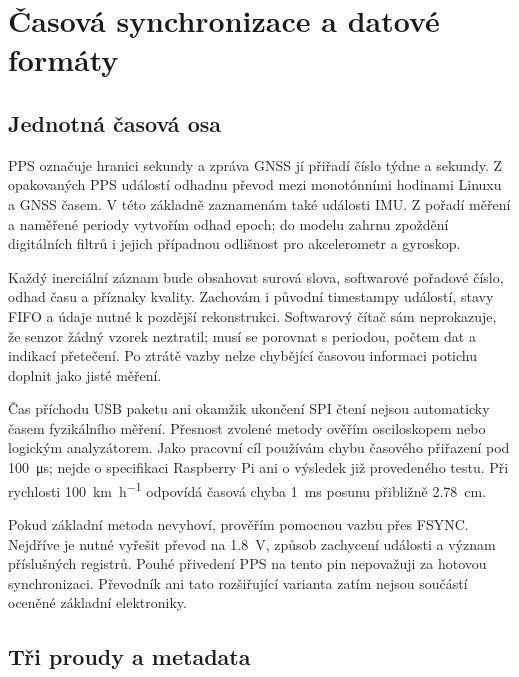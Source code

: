 \section{Časová synchronizace a datové formáty}

\subsection{Jednotná časová osa}

PPS označuje hranici sekundy a zpráva GNSS jí přiřadí číslo týdne a sekundy.
Z opakovaných PPS událostí odhadnu převod mezi monotónními hodinami Linuxu
a GNSS časem. V této základně zaznamenám také události IMU. Z pořadí měření
a naměřené periody vytvořím odhad epoch; do modelu zahrnu zpoždění digitálních
filtrů i jejich případnou odlišnost pro akcelerometr a gyroskop.

Každý inerciální záznam bude obsahovat surová slova, softwarové pořadové
číslo, odhad času a příznaky kvality. Zachovám i původní timestampy událostí,
stavy FIFO a údaje nutné k pozdější rekonstrukci. Softwarový čítač sám
neprokazuje, že senzor žádný vzorek neztratil; musí se porovnat s periodou,
počtem dat a indikací přetečení. Po ztrátě vazby nelze chybějící časovou
informaci potichu doplnit jako jisté měření.

Čas příchodu USB paketu ani okamžik ukončení SPI čtení nejsou automaticky
časem fyzikálního měření. Přesnost zvolené metody ověřím osciloskopem nebo
logickým analyzátorem. Jako pracovní cíl používám chybu časového přiřazení
pod \SI{100}{\micro\second}; nejde o specifikaci Raspberry Pi ani o výsledek
již provedeného testu. Při rychlosti \SI{100}{km\per\hour} odpovídá časová
chyba \SI{1}{ms} posunu přibližně \SI{2.78}{cm}.

Pokud základní metoda nevyhoví, prověřím pomocnou vazbu přes FSYNC.
Nejdříve je nutné vyřešit převod na \SI{1.8}{V}, způsob zachycení události
a význam příslušných registrů. Pouhé přivedení PPS na tento pin nepovažuji
za hotovou synchronizaci. Převodník ani tato rozšiřující varianta zatím
nejsou součástí oceněné základní elektroniky.

\subsection{Tři proudy a metadata}

